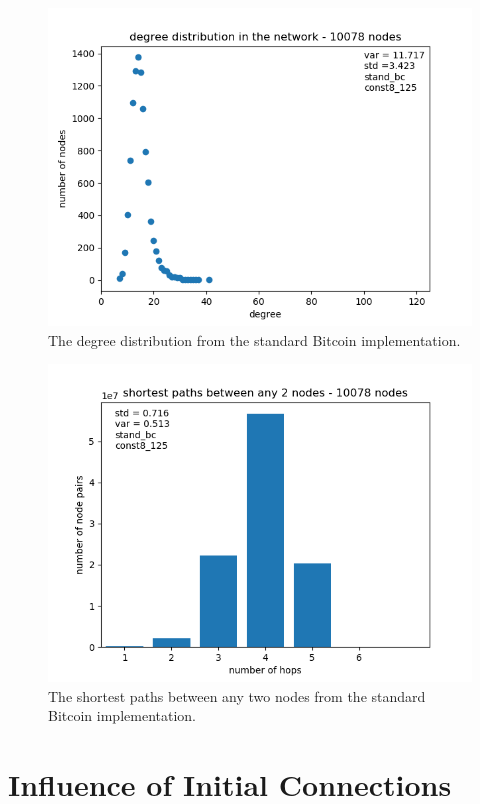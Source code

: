\documentclass[a4paper, oneside]{discothesis}
\begin{document}
\begin{figure}
    \centering
    \includegraphics[width=.8\columnwidth]{figures/standard-bitcoin/degree-distribution-10078-nodes.png}
    \caption{The degree distribution from the standard Bitcoin implementation.}
    \label{fig:standardBitcoinDegree}
\end{figure}

\begin{figure}
    \centering
    \includegraphics[width=.8\columnwidth]{figures/standard-bitcoin/final-shortest-paths-between-any-nodes-10078-nodes.png}
    \caption{The shortest paths between any two nodes from the standard Bitcoin implementation.}
    \label{fig:standardBitcoinShortestPaths}
\end{figure}

\section{Influence of Initial Connections}
\end{document}
